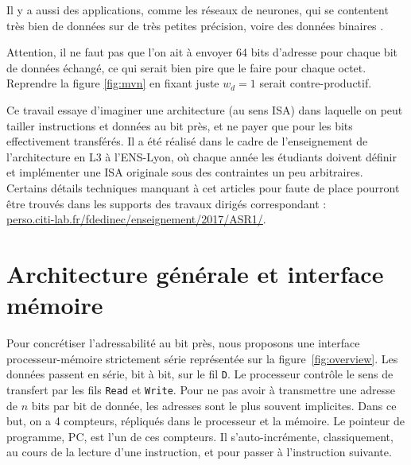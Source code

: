 \documentclass[architecture]{compas2018}
\newcommand{\todo}[1]{\textcolor{red}{TODO: #1}}
\begin{document}
Il y a aussi des applications, comme les réseaux de neurones, qui se contentent très bien de données sur de très petites précision, voire des données binaires \cite{AndriCRB16,AlemdarEtAl2017:TernaryCNN,AmiriEtAl2018:mixedPrecCNN,Preusser:DATE2018:heteroCNN}. 

Attention, il ne faut pas que l'on ait à envoyer 64 bits d'adresse pour chaque bit de données échangé, ce qui serait bien pire que le faire pour chaque octet. 
Reprendre la figure \ref{fig:mvn} en fixant juste $w_d=1$ serait contre-productif.

Ce travail essaye d'imaginer une architecture (au sens ISA) dans laquelle on peut tailler instructions et données au bit près, et ne payer que pour les bits effectivement transférés.
Il a été réalisé dans le cadre de l'enseignement de l'architecture en L3 à l'ENS-Lyon, où chaque année les étudiants doivent définir et implémenter une ISA originale sous des contraintes un peu arbitraires.
Certains détails techniques manquant à cet articles pour faute de place pourront être trouvés dans les supports des travaux dirigés correspondant : \\ \url{perso.citi-lab.fr/fdedinec/enseignement/2017/ASR1/}. 

\iffalse
\subsection{Pourquoi pas un jeu d'instruction au bit près?}

Les jeux d'instructions les plus compacts à notre connaissance sont les \emph{bytecodes} des machines virtuelles comme Java ou Python, qui émulent une machine à pile.
\todo{F2D}

\subsection{Contexte de ce travail}
Résumé des objectifs pédagogiques du cours ASR1

\todo{F2D}
\subsection{Plan}

\todo{F2D}
\fi


\section{Architecture générale et interface mémoire}
Pour concrétiser l'adressabilité au bit près, nous proposons une interface processeur-mémoire strictement série représentée sur la figure~\ref{fig:overview}.
Les données passent en série, bit à bit, sur le fil \texttt{D}.
Le processeur contrôle le sens de transfert par les fils \texttt{Read} et \texttt{Write}.
Pour ne pas avoir à transmettre une adresse de $n$ bits par bit de donnée, les adresses sont le plus souvent implicites.
Dans ce but, on a 4 compteurs, répliqués dans le processeur et la mémoire.
Le pointeur de programme, PC, est l'un de ces compteurs.
Il s'auto-incrémente, classiquement, au cours de la lecture d'une instruction, et pour passer à l'instruction suivante.
\end{document}
